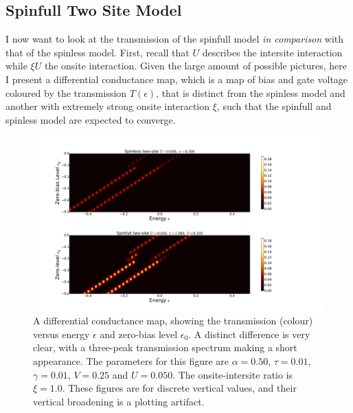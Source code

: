 \subsection{Spinfull Two Site Model}
I now want to look at the transmission of the spinfull model \emph{in comparison} with that of the spinless model. First, recall that $U$ describes the intersite interaction while $\xi U$ the onsite interaction. Given the large amount of possible pictures, here I present a differential conductance map, which is a map of bias and gate voltage coloured by the transmission $T(\epsilon)$, that is distinct from the spinless model and another with extremely strong onsite interaction $\xi$, such that the spinfull and spinless model are expected to converge. 
  
\begin{figure}[tb]
    \centering
    \includegraphics[height=.38\textheight]{pdf/map/transmap_u1_k2.pdf}
    \caption{A differential conductance map, showing the transmission (colour) versus energy $\epsilon$ and zero-bias level $\epsilon_0$. A distinct difference is very clear, with a three-peak transmission spectrum making a short appearance. The parameters for this figure are $\alpha=0.50$, $\tau=0.01$, $\gamma=0.01$, $V=0.25$ and $U=0.050$. The onsite-intersite ratio is $\xi=1.0$. These figures are for discrete vertical values, and their vertical broadening is a plotting artifact.}
    \label{fig:transmap12}
\end{figure} 
